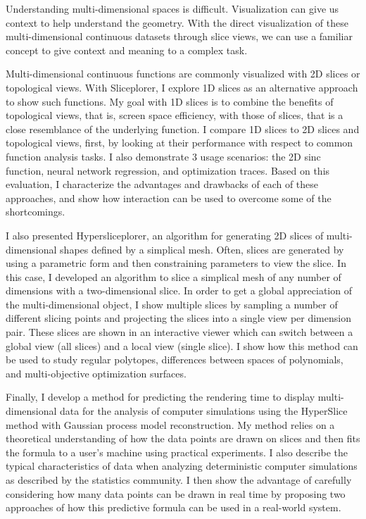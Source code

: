 
Understanding multi-dimensional spaces is difficult. Visualization can give
us context to help understand the geometry. With the direct visualization
of these multi-dimensional continuous datasets through slice views, we can
use a familiar concept to give context and meaning to a complex task.

Multi-dimensional continuous functions are commonly visualized with 2D slices
or topological views. With Sliceplorer, I explore 1D slices as an alternative
approach to show such functions. My goal with 1D slices is to combine the
benefits of topological views, that is, screen space efficiency, with those of
slices, that is a close resemblance of the underlying function.  I compare 1D
slices to 2D slices and topological views, first, by looking at their
performance with respect to common function analysis tasks. I also demonstrate
3 usage scenarios: the 2D sinc function, neural network regression, and
optimization traces. Based on this evaluation, I characterize the advantages
and drawbacks of each of these approaches, and show how interaction can be used
to overcome some of the shortcomings. 


I also presented Hypersliceplorer, an algorithm for generating 2D
slices of multi-dimensional shapes defined by a simplical mesh.  Often, slices
are generated by using a parametric form and then constraining parameters to
view the slice. In this case, I developed an algorithm to slice a simplical
mesh of any number of dimensions with a two-dimensional slice. In order to get
a global appreciation of the multi-dimensional object, I show multiple slices
by sampling a number of different slicing points and projecting the slices into
a single view per dimension pair. These slices are shown in an interactive
viewer which can switch between a global view (all slices) and a local view
(single slice). I show how this method can be used to study regular polytopes,
differences between spaces of polynomials, and multi-objective optimization
surfaces. 


Finally, I develop a method for predicting the rendering time to display
multi-dimensional data for the analysis of computer simulations using the
HyperSlice~\cite{Wijk:1993} method with Gaussian process model reconstruction.
My method relies on a theoretical understanding of how the data points are
drawn on slices and then fits the formula to a user's machine using practical
experiments.  I also describe the typical characteristics of data when
analyzing deterministic computer simulations as described by the statistics
community.  I then show the advantage of carefully considering how many data
points can be drawn in real time by proposing two approaches of how this
predictive formula can be used in a real-world system.


